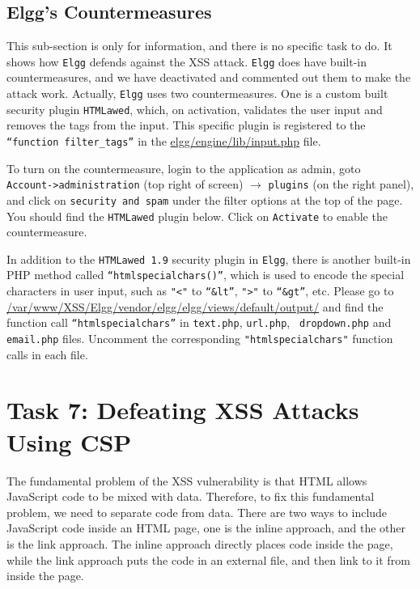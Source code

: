 \subsection{Elgg's Countermeasures}


This sub-section is only for information, and there is no specific task to do. 
It shows how {\tt Elgg} defends against the XSS attack. 
{\tt Elgg} does have built-in countermeasures, and
we have deactivated and commented out them to make the
attack work. Actually, {\tt Elgg} uses two countermeasures. 
One is a custom built security plugin {\tt HTMLawed}, 
which, on activation, validates the user input and removes the tags from the input.
This specific plugin is registered to the {\tt “function filter\_tags”} in the
\url{elgg/engine/lib/input.php} file. 


To turn on the countermeasure, login to the application as admin, goto {\tt
Account->administration} (top right of screen) $\rightarrow$ {\tt plugins} (on the right
panel), and click on {\tt security and spam} under the filter options at the top of the page.
You should find the {\tt HTMLawed} plugin below.  Click on {\tt Activate} to enable the
countermeasure.


In addition to the {\tt HTMLawed 1.9} security plugin in {\tt Elgg}, there is another built-in
PHP method called {\tt “htmlspecialchars()”}, which is used to encode the special characters in
user input, such as {\tt "<"} to {\tt “\&lt”}, {\tt ">"} to {\tt “\&gt”}, etc.
Please go to \url{/var/www/XSS/Elgg/vendor/elgg/elgg/views/default/output/} and
find the function call {\tt “htmlspecialchars”} in {\tt text.php}, {\tt url.php}, {\tt
dropdown.php} and {\tt email.php} files. Uncomment the corresponding {\tt "htmlspecialchars"}
function calls in each file. 



\section{Task 7: Defeating XSS Attacks Using CSP}

The fundamental problem of the XSS vulnerability is that HTML allows JavaScript code to be
mixed with data. Therefore, to fix this fundamental problem, we need to separate code from
data. There are two ways to include JavaScript code inside an HTML page, one is
the inline approach, and the other is the link approach.
The inline approach directly places code inside the page, while the
link approach puts the code in an external file, and then link to it
from inside the page.

